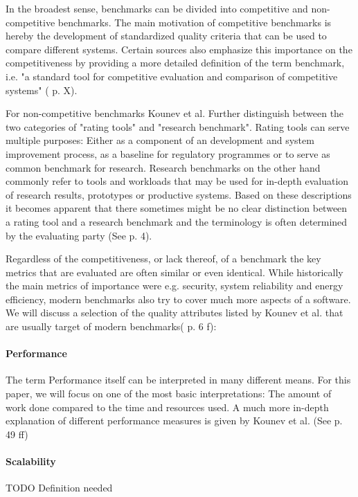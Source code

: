 \documentclass[	runningheads,
				a4paper]{llncs}
\begin{document}
In the broadest sense, benchmarks can be divided into competitive and non-competitive benchmarks. The main motivation of competitive benchmarks is hereby the development of standardized quality criteria that can be used to compare different systems. Certain sources also emphasize this importance on the competitiveness by providing a more detailed definition of the term benchmark, i.e. "a standard tool for competitive evaluation and comparison of competitive systems" (\cite{kistowski2015} p. X).

For non-competitive benchmarks Kounev et al. Further distinguish between the two categories of "rating tools" and "research benchmark". Rating tools can serve multiple purposes: Either as a component of an development and system improvement process, as a baseline for regulatory programmes or to serve as common benchmark for research. Research benchmarks on the other hand commonly refer to tools and workloads that may be used for in-depth evaluation of research results, prototypes or productive systems. Based on these descriptions it becomes apparent that there sometimes might be no clear distinction between a rating tool and a research benchmark and the terminology is often determined by the evaluating party (See \cite{Kounev} p. 4).

Regardless of the competitiveness, or lack thereof, of a benchmark the key metrics that are evaluated are often similar or even identical. While historically the main metrics of importance were e.g. security, system reliability and energy efficiency, modern benchmarks also try to cover much more aspects of a software. We will discuss a selection of the quality attributes listed by Kounev et al. that are usually target of modern benchmarks(\cite{Kounev} p. 6 f):

\paragraph{Performance} The term Performance itself can be interpreted in many different means. For this paper, we will focus on one of the most basic interpretations: The amount of work done compared to the time and resources used. A much more in-depth explanation of different performance measures is given by Kounev et al. (See \cite{Kounev} p. 49 ff)

\paragraph{Scalability} TODO Definition needed
\end{document}
